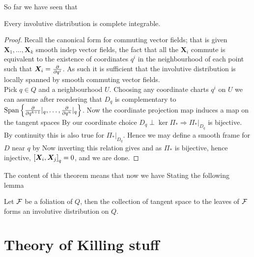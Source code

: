 \documentclass{article}
\begin{document}
So far we have seen that 
\begin{theorem}
Every involutive distribution is complete integrable. 
\end{theorem}
\begin{proof}
Recall the canonical form for commuting vector fields; that is given $\bm{X}_1, \dots, \bm{X}_k$ smooth indep vector fields, the fact that all the $\bm{X}_i$ commute is equivalent to the existence of coordinates $q^i$ in the neighbourhood of each point such that $\bm{X}_i = \pd{q^i}$. As such it is sufficient that the involutive distribution is locally spanned by smooth commuting vector fields. \\
Pick $q \in Q$ and a neighbourhood $U$. Choosing any coordinate charts $q^i$ on $U$ we can assume after reordering that $D_q$ is complementary to $\spn\pbrace{\pd{q^{k+1}}|_q, \dots, \pd{q^n}|_q}$. Now the coordinate projection map
induces a map on the tangent spaces 
By our coordinate choice $D_q \perp \ker \Pi_\ast \Rightarrow \Pi_\ast |_{D_q}$ is bijective. By continuity this is also true for $\Pi_\ast |_{D_q}$. Hence we may define a smooth frame for $D$ near $q$ by 
Now inverting this relation gives 
and as $\Pi_\ast$ is bijective, hence injective, $\comm[\bm{X}_i]{\bm{X}_j}_q = 0$, and we are done. 
\end{proof}
The content of this theorem means that now we have
Stating the following lemma 
\begin{lemma}
Let $\mc{F}$ be a foliation of $Q$, then the collection of tangent space to the leaves of $\mc{F}$ forms an involutive distribution on $Q$. 
\end{lemma}

\section{Theory of Killing stuff}
\end{document}
